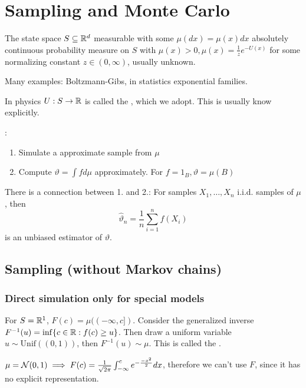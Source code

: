 \chapter{Sampling and Monte Carlo}

The state space \(S\subseteq \mathbb{R}^d\) measurable with some \(\mu(dx)=\mu(x)dx\) absolutely continuous 
probability measure on \(S\) with \( \mu(x)>0, \mu(x)=\frac{1}{z}e^{-U(x)}\) 
for some normalizing constant \(z\in(0,\infty)\), usually unknown.

Many examples: Boltzmann-Gibs, in statistics exponential families.

In physics \(U:S\to\mathbb{R}\) is called the , which we adopt. This is usually know explicitly.

:
\begin{enumerate}
    \item {} Simulate a approximate sample from \(\mu\)
    \item {} Compute \(\vartheta=\int fd\mu\) approximately. For \(f=1_B,\vartheta=\mu(B)\)
\end{enumerate}

There is a connection between 1. and 2.: For samples \(X_1,\dots,X_n\) i.i.d. samples of \(\mu\), then 
\[\hat{\vartheta}_n=\frac{1}{n}\sum_{i=1}^n f(X_i)\] is an unbiased estimator of \(\vartheta\).

\section{Sampling (without Markov chains)}

\subsection{Direct simulation only for special models}

\begin{example}
    For \(S=\mathbb{R}^1\), \(F(c)=\mu((-\infty,c])\). Consider the generalized inverse \(F^{-1}(u)=\inf\{c\in\mathbb{R}: f(c)\geq u\}\).
Then draw a uniform variable \(u\sim\text{Unif}((0,1))\), then \(F^{-1}(u)\sim\mu\). This is called the .

\end{example}

\begin{remark}
    \(\mu=\mathcal{N}(0,1)\implies F(c)=\frac{1}{\sqrt{2\pi}}\int_{-\infty}^c e^{-\frac{-x^2}{2}}dx\), therefore we can't use \(F\), since it has no explicit representation.
\end{remark}

